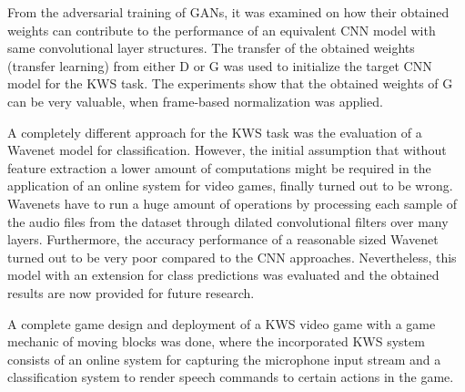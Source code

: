 From the adversarial training of GANs, it was examined on how their obtained weights can contribute to the performance of an equivalent CNN model with same convolutional layer structures.
The transfer of the obtained weights (transfer learning) from either D or G was used to initialize the target CNN model for the KWS task.
The experiments show that the obtained weights of G can be very valuable, when frame-based normalization was applied.

A completely different approach for the KWS task was the evaluation of a Wavenet \cite{Oord2016} model for classification.
However, the initial assumption that without feature extraction a lower amount of computations might be required in the application of an online system for video games, finally turned out to be wrong.
Wavenets have to run a huge amount of operations by processing each sample of the audio files from the dataset through dilated convolutional filters over many layers.
Furthermore, the accuracy performance of a reasonable sized Wavenet turned out to be very poor compared to the CNN approaches.
Nevertheless, this model with an extension for class predictions was evaluated and the obtained results are now provided for future research.

A complete game design and deployment of a KWS video game with a game mechanic of moving blocks was done, where the incorporated KWS system consists of an online system for capturing the microphone input stream and a classification system to render speech commands to certain actions in the game.